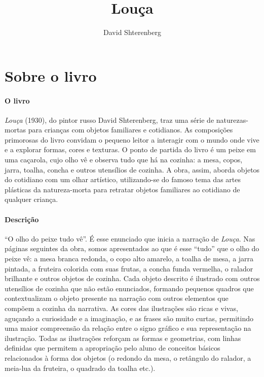 \documentclass[11pt]{extarticle}
\newcommand{\AutorLivro}{David Shterenberg}
\newcommand{\TituloLivro}{Louça}
\newcommand{\colaborador}{{Paulo Pompermaier e Renier Silva}}
\begin{document}
\title{\TituloLivro}
\author{\AutorLivro}
\def\authornotes{\colaborador}

\date{}
\maketitle


\tableofcontents



\section{Sobre o livro}

\paragraph{O livro} \textit{Louça} (1930), do pintor russo David Shterenberg, traz uma série de naturezas-mortas para crianças com objetos familiares e cotidianos. As composições primorosas do livro convidam o pequeno leitor a interagir com o mundo onde vive e a explorar formas, cores e texturas. O ponto de partida do livro é um peixe em uma caçarola, cujo olho vê e observa tudo que há na cozinha: a mesa, copos, jarra, toalha, concha e outros utensílios de cozinha. A obra, assim, aborda objetos do cotidiano com um olhar artístico, utilizando-se do famoso tema das artes plásticas da natureza-morta para retratar objetos familiares ao cotidiano de qualquer criança.


\paragraph{Descrição} ``O olho do peixe tudo vê''. É esse enunciado que inicia a narração de \textit{Louça}. Nas páginas seguintes da obra, somos apresentados ao que é esse ``tudo'' que o olho do peixe vê: a mesa branca redonda, o copo alto amarelo, a toalha de mesa, a jarra pintada, a fruteira colorida com suas frutas, a concha funda vermelha, o ralador brilhante e outros objetos de cozinha. Cada objeto descrito é ilustrado com outros utensílios de cozinha que não estão enunciados, formando pequenos quadros que contextualizam o objeto presente na narração com outros elementos que compõem a cozinha da narrativa. As cores das ilustrações são ricas e vivas, aguçando a curiosidade e a imaginação, e as frases são muito curtas, permitindo uma maior compreensão da relação entre o signo gráfico e sua representação na ilustração. Todas as ilustrações reforçam as formas e geometrias, com linhas definidas que permitem a apropriação pelo aluno de conceitos básicos relacionados à forma dos objetos (o redondo da mesa, o retângulo do ralador, a meia-lua da fruteira, o quadrado da toalha etc.).
\end{document}
